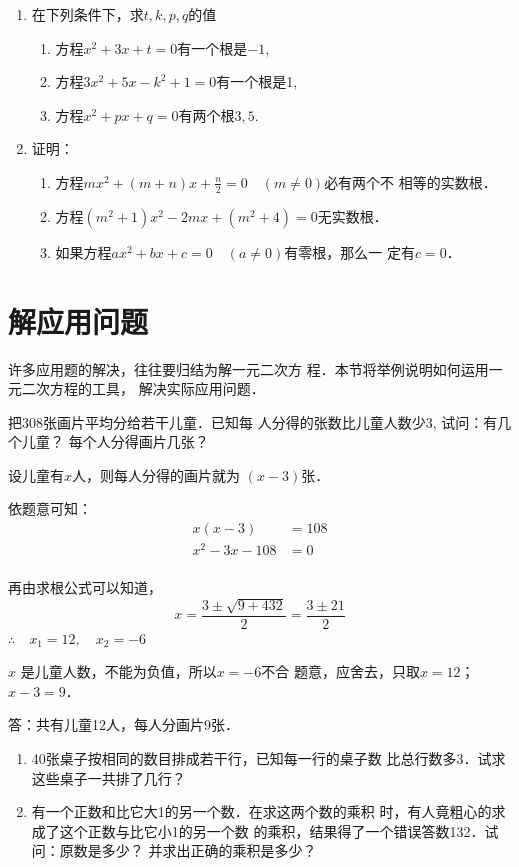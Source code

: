 \begin{enumerate}
\item 在下列条件下，求$t,k,p,q$的值
\begin{enumerate}
    \item 方程$x^2+3x+t=0$有一个根是$-1$,
    \item 方程$3x^2+5x-k^2+1=0$有一个根是1,
    \item 方程$ x^2+px+q=0$有两个根$3,5$.
\end{enumerate}
\item 证明：
\begin{enumerate}
    \item 方程$mx^2+(m+n)x+\frac{n}{2}=0\quad (m\ne 0)$必有两个不
相等的实数根．
\item 方程$(m^2+1)x^2-2mx+(m^2+4)=0$无实数根．
\item 如果方程$ax^2+bx+c=0\quad (a\ne 0)$有零根，那么一
定有$c=0$．
\end{enumerate}


\end{enumerate}


\section{解应用问题}
许多应用题的解决，往往要归结为解一元二次方
程．本节将举例说明如何运用一元二次方程的工具，
解决实际应用问题．

\begin{example}
把308张画片平均分给若干儿童．已知每
人分得的张数比儿童人数少3, 试问：有几个儿童？
每个人分得画片几张？
\end{example}

\begin{solution}
    设儿童有$x$人，则每人分得的画片就为
$(x-3)$张．

依题意可知：\[\begin{split}
    x(x-3)&=108\\
x^2-3x-108&=0\\
\end{split}\]

再由求根公式可以知道，
\[x=\frac{3\pm\sqrt{9+432}}{2}=\frac{3\pm 21}{2}  \]
$\therefore\quad x_1=12,\quad x_2=-6$

$x$
是儿童人数，不能为负值，所以$x=-6$不合
题意，应舍去，只取$x=12$； $x-3=9$．

答：共有儿童12人，每人分画片9张．
\end{solution}

\begin{ex}
\begin{enumerate}
    \item 40张桌子按相同的数目排成若干行，已知每一行的桌子数
    比总行数多3．试求这些桌子一共排了几行？
    \item 有一个正数和比它大1的另一个数．在求这两个数的乘积
    时，有人竟粗心的求成了这个正数与比它小1的另一个数
    的乘积，结果得了一个错误答数132．试问：原数是多少？
    并求出正确的乘积是多少？
\end{enumerate}
\end{ex}

